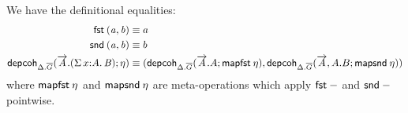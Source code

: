 We have the definitional equalities:
\[\begin{aligned}
\fst{(a,b)} &\equiv a \\
\snd{(a,b)} &\equiv b \\
\depcoh{\Delta.\diag G}{\tel A.(\sigmacl xAB)}{\eta} &\equiv
(\depcoh{\Delta.\diag G}{\tel A.A}{\mapfst\eta},
\depcoh{\Delta.\diag G}{\tel A,A.B}{\mapsnd\eta}) \\
\end{aligned}\]
where $\mapfst\eta$ and $\mapsnd\eta$ are meta-operations which apply $\fst-$
and $\snd-$ pointwise.










%
%
%
% 
%

